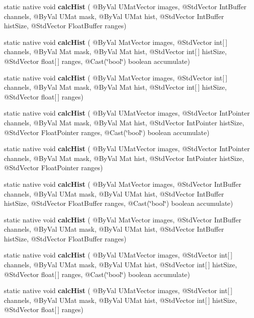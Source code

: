 \begin{DoxyCompactItemize}
\item 
static native void {\bfseries calc\+Hist} ( @By\+Val U\+Mat\+Vector images, @Std\+Vector Int\+Buffer channels, @By\+Val U\+Mat mask, @By\+Val U\+Mat hist, @Std\+Vector Int\+Buffer hist\+Size, @Std\+Vector Float\+Buffer ranges)
\item 
static native void {\bfseries calc\+Hist} ( @By\+Val Mat\+Vector images, @Std\+Vector int\mbox{[}$\,$\mbox{]} channels, @By\+Val Mat mask, @By\+Val Mat hist, @Std\+Vector int\mbox{[}$\,$\mbox{]} hist\+Size, @Std\+Vector float\mbox{[}$\,$\mbox{]} ranges, @Cast(\char`\"{}bool\char`\"{}) boolean accumulate)
\item 
static native void {\bfseries calc\+Hist} ( @By\+Val Mat\+Vector images, @Std\+Vector int\mbox{[}$\,$\mbox{]} channels, @By\+Val Mat mask, @By\+Val Mat hist, @Std\+Vector int\mbox{[}$\,$\mbox{]} hist\+Size, @Std\+Vector float\mbox{[}$\,$\mbox{]} ranges)
\item 
static native void {\bfseries calc\+Hist} ( @By\+Val U\+Mat\+Vector images, @Std\+Vector Int\+Pointer channels, @By\+Val Mat mask, @By\+Val Mat hist, @Std\+Vector Int\+Pointer hist\+Size, @Std\+Vector Float\+Pointer ranges, @Cast(\char`\"{}bool\char`\"{}) boolean accumulate)
\item 
static native void {\bfseries calc\+Hist} ( @By\+Val U\+Mat\+Vector images, @Std\+Vector Int\+Pointer channels, @By\+Val Mat mask, @By\+Val Mat hist, @Std\+Vector Int\+Pointer hist\+Size, @Std\+Vector Float\+Pointer ranges)
\item 
static native void {\bfseries calc\+Hist} ( @By\+Val Mat\+Vector images, @Std\+Vector Int\+Buffer channels, @By\+Val U\+Mat mask, @By\+Val U\+Mat hist, @Std\+Vector Int\+Buffer hist\+Size, @Std\+Vector Float\+Buffer ranges, @Cast(\char`\"{}bool\char`\"{}) boolean accumulate)
\item 
static native void {\bfseries calc\+Hist} ( @By\+Val Mat\+Vector images, @Std\+Vector Int\+Buffer channels, @By\+Val U\+Mat mask, @By\+Val U\+Mat hist, @Std\+Vector Int\+Buffer hist\+Size, @Std\+Vector Float\+Buffer ranges)
\item 
static native void {\bfseries calc\+Hist} ( @By\+Val U\+Mat\+Vector images, @Std\+Vector int\mbox{[}$\,$\mbox{]} channels, @By\+Val U\+Mat mask, @By\+Val U\+Mat hist, @Std\+Vector int\mbox{[}$\,$\mbox{]} hist\+Size, @Std\+Vector float\mbox{[}$\,$\mbox{]} ranges, @Cast(\char`\"{}bool\char`\"{}) boolean accumulate)
\item 
static native void {\bfseries calc\+Hist} ( @By\+Val U\+Mat\+Vector images, @Std\+Vector int\mbox{[}$\,$\mbox{]} channels, @By\+Val U\+Mat mask, @By\+Val U\+Mat hist, @Std\+Vector int\mbox{[}$\,$\mbox{]} hist\+Size, @Std\+Vector float\mbox{[}$\,$\mbox{]} ranges)

\end{DoxyCompactItemize}
